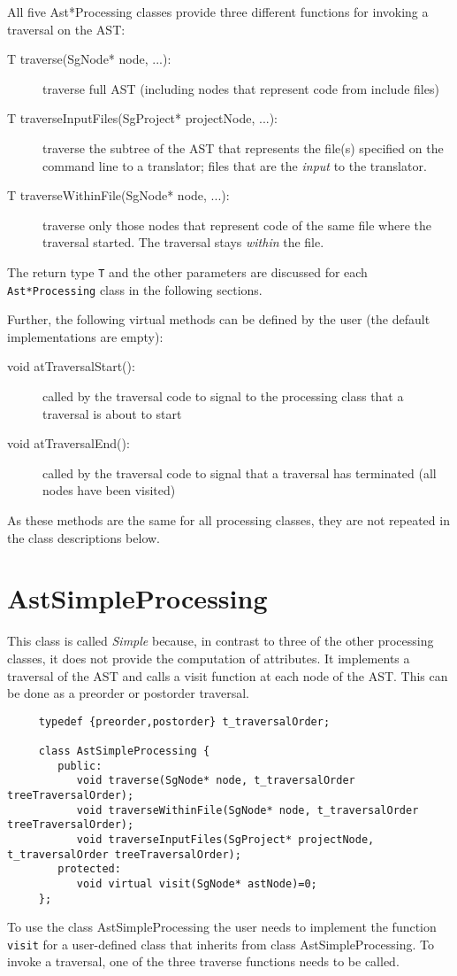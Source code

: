 All five Ast*Processing classes provide three different functions for invoking a traversal on the AST:

\begin{description}
\item[T traverse(SgNode* node, ...):] traverse full AST (including nodes that represent code from include files)
\item[T traverseInputFiles(SgProject* projectNode, ...):] traverse the subtree of the AST
    that represents the file(s) specified on the command line to a translator; files that
    are the {\em input} to the translator.
\item[T traverseWithinFile(SgNode* node, ...):] traverse only those nodes that represent 
code of the same file where the traversal started. The traversal stays {\em within} the file.
\end{description}

The return type {\tt T} and the other parameters are discussed for each {\tt Ast*Processing} class in the following sections.

Further, the following virtual methods can be defined by the user (the default
implementations are empty):
\begin{description}
\item[void atTraversalStart():] called by the traversal code to signal to the
processing class that a traversal is about to start
\item[void atTraversalEnd():] called by the traversal code to signal that a
traversal has terminated (all nodes have been visited)
\end{description}

As these methods are the same for all processing classes, they are not
repeated in the class descriptions below.

\section{AstSimpleProcessing}
\label{AstProcessing:AstSimpleProcessing}

This class is called {\em Simple} because, in contrast to three of the other
processing classes, it does not provide the computation of
attributes. It implements a traversal of the AST and calls a
visit function at each node of the AST. This can be done as
a preorder or postorder traversal.

{\indent
{\mySmallFontSize
\begin{verbatim}
     typedef {preorder,postorder} t_traversalOrder;

     class AstSimpleProcessing {
        public:
           void traverse(SgNode* node, t_traversalOrder treeTraversalOrder);
           void traverseWithinFile(SgNode* node, t_traversalOrder treeTraversalOrder);
           void traverseInputFiles(SgProject* projectNode, t_traversalOrder treeTraversalOrder);
        protected:
           void virtual visit(SgNode* astNode)=0;
     };
\end{verbatim}
}}
To use the class AstSimpleProcessing the user needs to implement the
function {\tt visit} for a user-defined class that inherits
from class AstSimpleProcessing. To invoke a traversal, one of the three
traverse functions needs to be called.


